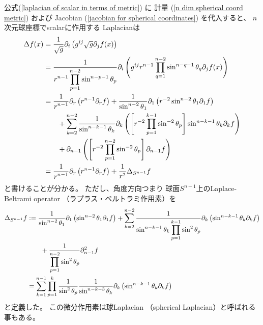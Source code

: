 公式(\ref{laplacian of scalar in terms of metric})
に
計量
(\ref{n dim spherical coord metric})
および
Jacobian
(\ref{jacobian for spherical coordinates})
を代入すると、
$n$次元球座標でscalarに作用する
Laplacianは
\begin{align}
    \Delta f(x)
&=
    \dfrac{1}{ \sqrt {g} }
    \partial_i
    \left(
        g^{ij}
        \sqrt{ g }
        \partial_j
        f (x)
    \right)
\notag\\&
=
    \dfrac{1}{
    \displaystyle
        r^{n-1}
        \prod_{p = 1}^{n-2}
        \sin^{n - p - 1} \theta_p
    }
    \partial_i
    \left(
        g^{ij}
        r^{n-1}
        \prod_{q = 1}^{n-2}
        \sin^{n - q - 1} \theta_q
        \partial_j
        f (x)
    \right)
\notag\\&
=
    \dfrac{1}{
    \displaystyle
        r^{n-1}
    }
    \partial_r
    \left(
        r^{n-1}
        \partial_r
        f
    \right)
+
    \dfrac{1}{
    \displaystyle
        \sin^{n - 2} \theta_1
    }
    \partial_1
    \left(
        r^{-2}
        \sin^{n - 2} \theta_1
        \partial_1
        f
    \right)
\notag\\&\qquad
+
\sum_{k = 2}^{n-2}
    \dfrac{1}{
    \displaystyle
        \sin^{n - k - 1} \theta_k
    }
    \partial_k
    \left(
    \left[
        r^{-2}
        \prod_{p=1}^{k-1}
        \sin^{-2} \theta_p
    \right]
        \sin^{n - k - 1} \theta_k
        \partial_k
        f
    \right)
\notag\\&\qquad
+
    \partial_{n-1}
    \left(
        \left[
            r^{-2}
            \prod_{p=1}^{n-2}
            \sin^{-2} \theta_p
        \right]
        \partial_{n-1}
        f
    \right)
\notag\\&
=
    \dfrac{1}{
    \displaystyle
        r^{n-1}
    }
    \partial_r
    \left(
        r^{n-1}
        \partial_r
        f
    \right)
+
    \dfrac{1}{r^2}
        \Delta_{S^{n-1}}
        f
\end{align}
と書けることが分かる。
ただし、角度方向つまり
球面$S^{n-1}$上のLaplace-Beltrami operator
（ラプラス・ベルトラミ作用素）を
\begin{align}
    \Delta_{S^{n-1}} f
&:=
        \dfrac{1}{
    \displaystyle
        \sin^{n - 2} \theta_1
    }
    \partial_1
    \left(
        \sin^{n - 2} \theta_1
        \partial_1
        f
    \right)
+
\sum_{k = 2}^{n-2}
    \dfrac{1}{
    \displaystyle
        \sin^{n - k - 1} \theta_k
        \prod_{p=1}^{k-1}
        \sin^{2} \theta_p
    }
    \partial_k
    \left(
        \sin^{n - k - 1} \theta_k
        \partial_k
        f
    \right)
\notag\\&\qquad
+
    \dfrac{1}{
    \displaystyle
        \prod_{p=1}^{n-2}
        \sin^{2} \theta_p
    }
    \partial_{n-1}^2
        f
\notag\\&
=
    \sum_{k = 1}^{n - 1}
    \prod_{p = 1}^{k}
    \dfrac{1}{\sin^2 \theta_p}
    \dfrac{1}{\sin^{n - k - 3} \theta_k}
    \partial_k
    \left(
        \sin^{n - k - 1} \theta_k
        \partial_k
        f
    \right)
\end{align}
と定義した。
この微分作用素は球Laplacian
（spherical Laplacian）と呼ばれる事もある。


